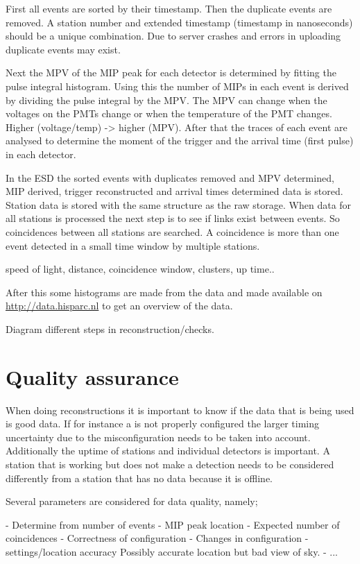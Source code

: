 First all events are sorted by their timestamp. Then the duplicate
events are removed. A station number and extended timestamp (timestamp
in nanoseconds) should be a unique combination. Due to server crashes
and errors in uploading duplicate events may exist.

Next the MPV of the MIP peak for each detector is determined by fitting
the pulse integral histogram. Using this the number of MIPs in each
event is derived by dividing the pulse integral by the MPV. The MPV can
change when the voltages on the PMTs change or when the temperature of
the PMT changes. Higher (voltage/temp) -> higher (MPV). After that the
traces of each event are analysed to determine the moment of the trigger
and the arrival time (first pulse) in each detector.

In the ESD the sorted events with duplicates removed and MPV determined,
MIP derived, trigger reconstructed and arrival times determined data is
stored. Station data is stored with the same structure as the raw
storage. When data for all stations is processed the next step is to see
if links exist between events. So coincidences between all stations are
searched. A coincidence is more than one event detected in a small time
window by multiple stations.

speed of light, distance, coincidence window, clusters, up time..

After this some histograms are made from the data and made available on
\url{http://data.hisparc.nl} to get an overview of the data.

Diagram different steps in reconstruction/checks.


\section{Quality assurance}

When doing reconstructions it is important to know if the data that is
being used is good data. If for instance a \gps is not properly
configured the larger timing uncertainty due to the misconfiguration
needs to be taken into account. Additionally the uptime of stations and
individual detectors is important. A station that is working but does
not make a detection needs to be considered differently from a station
that has no data because it is offline.

Several parameters are considered for data quality, namely;

- Determine from number of events
- MIP peak location
- Expected number of coincidences
- Correctness of configuration
- Changes in configuration
- \gps settings/location accuracy
    Possibly accurate location but bad view of sky.
- ...


